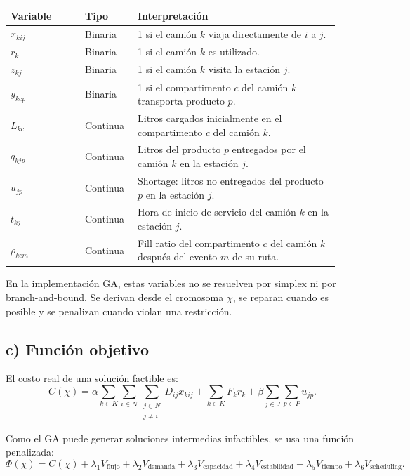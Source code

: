 \documentclass[11pt,letterpaper]{article}
\begin{document}
\begin{longtable}{p{0.21\linewidth}p{0.14\linewidth}p{0.58\linewidth}}
\toprule
\textbf{Variable} & \textbf{Tipo} & \textbf{Interpretación} \\
\midrule
\endhead
\(x_{kij}\) & Binaria & 1 si el camión \(k\) viaja directamente de \(i\) a \(j\). \\
\(r_k\) & Binaria & 1 si el camión \(k\) es utilizado. \\
\(z_{kj}\) & Binaria & 1 si el camión \(k\) visita la estación \(j\). \\
\(y_{kcp}\) & Binaria & 1 si el compartimento \(c\) del camión \(k\) transporta producto \(p\). \\
\(L_{kc}\) & Continua & Litros cargados inicialmente en el compartimento \(c\) del camión \(k\). \\
\(q_{kjp}\) & Continua & Litros del producto \(p\) entregados por el camión \(k\) en la estación \(j\). \\
\(u_{jp}\) & Continua & Shortage: litros no entregados del producto \(p\) en la estación \(j\). \\
\(t_{kj}\) & Continua & Hora de inicio de servicio del camión \(k\) en la estación \(j\). \\
\(\rho_{kcm}\) & Continua & Fill ratio del compartimento \(c\) del camión \(k\) después del evento \(m\) de su ruta. \\
\bottomrule
\end{longtable}

En la implementación GA, estas variables no se resuelven por simplex ni por branch-and-bound.
Se derivan desde el cromosoma \(\chi\), se reparan cuando es posible y se penalizan cuando
violan una restricción.

\subsection{c) Función objetivo}

El costo real de una solución factible es:
\[
    C(\chi)=
    \alpha \sum_{k\in K}\sum_{i\in N}\sum_{\substack{j\in N\\j\neq i}} D_{ij}x_{kij}
    + \sum_{k\in K}F_kr_k
    + \beta\sum_{j\in J}\sum_{p\in P}u_{jp}.
\]

Como el GA puede generar soluciones intermedias infactibles, se usa una función penalizada:
\[
    \Phi(\chi)=C(\chi)
    +\lambda_1V_{\text{flujo}}
    +\lambda_2V_{\text{demanda}}
    +\lambda_3V_{\text{capacidad}}
    +\lambda_4V_{\text{estabilidad}}
    +\lambda_5V_{\text{tiempo}}
    +\lambda_6V_{\text{scheduling}}.
\]
\end{document}
